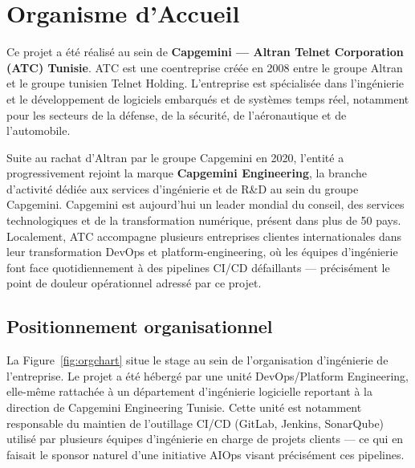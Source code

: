 \documentclass[12pt,a4paper,oneside]{report}
\begin{document}
\section{Organisme d'Accueil}
Ce projet a été réalisé au sein de \textbf{Capgemini --- Altran Telnet Corporation (ATC) Tunisie}. ATC est une coentreprise créée en 2008 entre le groupe Altran et le groupe tunisien Telnet Holding. L'entreprise est spécialisée dans l'ingénierie et le développement de logiciels embarqués et de systèmes temps réel, notamment pour les secteurs de la défense, de la sécurité, de l'aéronautique et de l'automobile.

Suite au rachat d'Altran par le groupe Capgemini en 2020, l'entité a progressivement rejoint la marque \textbf{Capgemini Engineering}, la branche d'activité dédiée aux services d'ingénierie et de R\&D au sein du groupe Capgemini. Capgemini est aujourd'hui un leader mondial du conseil, des services technologiques et de la transformation numérique, présent dans plus de 50 pays. Localement, ATC accompagne plusieurs entreprises clientes internationales dans leur transformation DevOps et platform-engineering, où les équipes d'ingénierie font face quotidiennement à des pipelines CI/CD défaillants --- précisément le point de douleur opérationnel adressé par ce projet.

\subsection{Positionnement organisationnel}
La Figure~\ref{fig:orgchart} situe le stage au sein de l'organisation d'ingénierie de l'entreprise. Le projet a été hébergé par une unité DevOps/Platform Engineering, elle-même rattachée à un département d'ingénierie logicielle reportant à la direction de Capgemini Engineering Tunisie. Cette unité est notamment responsable du maintien de l'outillage CI/CD (GitLab, Jenkins, SonarQube) utilisé par plusieurs équipes d'ingénierie en charge de projets clients --- ce qui en faisait le sponsor naturel d'une initiative AIOps visant précisément ces pipelines.
\end{document}
